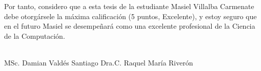 \begin{opinion}
Por tanto, considero que a esta tesis de la estudiante Masiel Villalba Carmenate debe otorg\'arsele la m\'axima calificaci\'on (5 puntos, Excelente), y estoy seguro que en el futuro Masiel se desempe\~nar\'a como una excelente profesional de la Ciencia de la Computaci\'on.


\vfill
\begin{flushleft}
\underline{\hspace{140pt}}\hfill \underline{\hspace{140pt}}\\
MSc. Damian Vald\'es Santiago \hfill Dra.C. Raquel Mar\'ia River\'on \hspace*{7pt}
\end{flushleft}
\end{opinion}